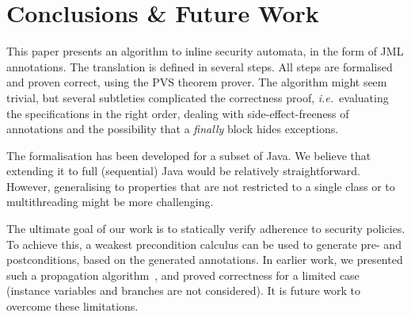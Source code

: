 \section{Conclusions \& Future Work }\label{SecConcl}

This paper presents an algorithm to inline security automata, in the
form of JML annotations. The translation is defined in several
steps. All steps are formalised and proven correct, using the PVS
theorem prover. The algorithm might seem trivial, but several
subtleties complicated the correctness proof, \emph{i.e.}~evaluating
the specifications in the right order, dealing with
side-effect-freeness of annotations and the possibility that a
\emph{finally} block hides exceptions.


The formalisation has been developed for a subset of Java. We believe
that extending it to full (sequential) Java would be relatively
straightforward. However, generalising to properties that are not
restricted to a single class or to multithreading might be more
challenging.

The ultimate goal of our work is to statically verify adherence to
security policies. To achieve this, a weakest precondition calculus can
be used to generate pre- and postconditions, based on the generated
\Set annotations. In earlier work, we presented such a
propagation algorithm~\cite{PavlovaBBHL04}, and proved correctness for
a limited case (instance variables and branches are not
considered). It is future work to overcome these limitations.
